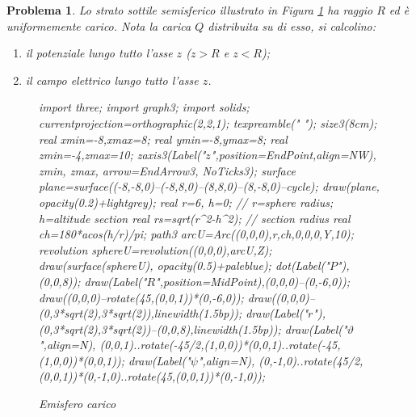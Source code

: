 \documentclass[b5paper,twoside]{book}
\newtheorem{problema}{Problema}
\let\oldhat\hat
\renewcommand{\vec}[1]{\mathbf{#1}}
\renewcommand{\hat}[1]{\widehat{\mathbf{#1}}}
\begin{document}
\begin{problema}
	Lo strato sottile semisferico illustrato in Figura \ref{fig:emisfero_carico} ha raggio
	$R$ ed è uniformemente carico. Nota la carica $Q$ distribuita su di esso, si calcolino:
	\begin{enumerate}
		\item il potenziale lungo tutto l'asse $z$ ($z>R$ e $z<R$);
		\item il campo elettrico lungo tutto l'asse $z$.
	\end{enumerate}
	\begin{figure}%
		\centering
		\begin{asy}[height=6cm,inline=true,attach=false,viewportwidth=\linewidth]
			import three;
			import graph3;
			import solids;
			currentprojection=orthographic(2,2,1);
			texpreamble("\let\oldhat\hat
			\renewcommand{\vec}[1]{\mathbf{#1}}
			\renewcommand{\hat}[1]{\oldhat{\mathbf{#1}}}");
			size3(8cm);
			real xmin=-8,xmax=8;
			real ymin=-8,ymax=8;
			real zmin=-4,zmax=10;
			zaxis3(Label("\small $z$",position=EndPoint,align=NW),
			zmin, zmax, arrow=EndArrow3, NoTicks3);
			surface plane=surface((-8,-8,0)--(-8,8,0)--(8,8,0)--(8,-8,0)--cycle);
			draw(plane, opacity(0.2)+lightgrey);
			real r=6, h=0; // r=sphere radius; h=altitude section
			real rs=sqrt(r^2-h^2); // section radius
			real ch=180*acos(h/r)/pi;
			path3 arcU=Arc((0,0,0),r,ch,0,0,0,Y,10);
			revolution sphereU=revolution((0,0,0),arcU,Z);
			draw(surface(sphereU), opacity(0.5)+paleblue);
			dot(Label("\small $P$"),(0,0,8));
			draw(Label("\small $R$",position=MidPoint),(0,0,0)--(0,-6,0));
			draw((0,0,0)--rotate(45,(0,0,1))*(0,-6,0));
			draw((0,0,0)--(0,3*sqrt(2),3*sqrt(2)),linewidth(1.5bp));
			draw(Label("\small $r$"),(0,3*sqrt(2),3*sqrt(2))--(0,0,8),linewidth(1.5bp));
			draw(Label("\small $\vartheta$",align=N),
			(0,0,1)..rotate(-45/2,(1,0,0))*(0,0,1)..rotate(-45,(1,0,0))*(0,0,1));
			draw(Label("\small $\psi$",align=N),
			(0,-1,0)..rotate(45/2,(0,0,1))*(0,-1,0)..rotate(45,(0,0,1))*(0,-1,0));
		\end{asy}
		\caption{Emisfero carico}
		\label{fig:emisfero_carico}
	\end{figure}	
\end{problema}
\end{document}
